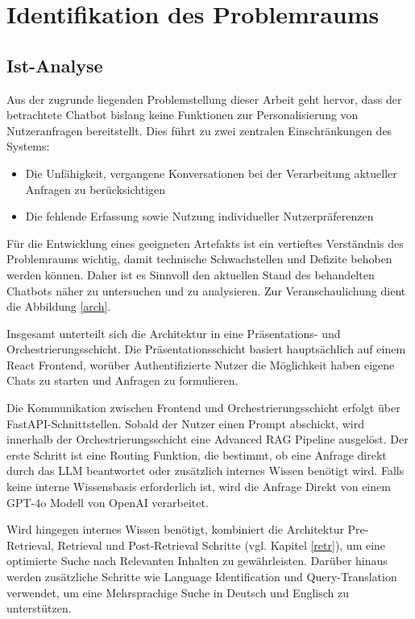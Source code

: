 



\label{Kapitel3}
\section{Identifikation des Problemraums}
\subsection{Ist-Analyse}
Aus der zugrunde liegenden Problemstellung dieser Arbeit geht hervor, dass der betrachtete Chatbot bislang keine Funktionen zur Personalisierung von Nutzeranfragen bereitstellt. Dies führt zu zwei zentralen Einschränkungen des Systems:

\begin{itemize}
	\item Die Unfähigkeit, vergangene Konversationen bei der Verarbeitung aktueller Anfragen zu berücksichtigen
	\item Die fehlende Erfassung sowie Nutzung individueller Nutzerpräferenzen
\end{itemize}

Für die Entwicklung eines geeigneten Artefakts ist ein vertieftes Verständnis des Problemraums wichtig, damit technische Schwachstellen und Defizite behoben werden können. Daher ist es Sinnvoll den aktuellen Stand des behandelten Chatbots näher zu untersuchen und zu analysieren. Zur Veranschaulichung dient die Abbildung \ref{arch}.

Insgesamt unterteilt sich die Architektur in eine Präsentations- und Orchestrierungsschicht. Die Präsentationsschicht basiert hauptsächlich auf einem React Frontend, worüber Authentifizierte Nutzer die Möglichkeit haben eigene Chats zu starten und Anfragen zu formulieren.

Die Kommunikation zwischen Frontend und Orchestrierungsschicht erfolgt über FastAPI-Schnittstellen. Sobald der Nutzer einen Prompt abschickt, wird innerhalb der Orchestrierungsschicht eine Advanced RAG Pipeline ausgelöst. Der erste Schritt ist eine Routing Funktion, die bestimmt, ob eine Anfrage direkt durch das LLM beantwortet oder zusätzlich internes Wissen benötigt wird. Falls keine interne Wissensbasis erforderlich ist, wird die Anfrage Direkt von einem GPT-4o Modell von OpenAI verarbeitet. 

Wird hingegen internes Wissen benötigt, kombiniert die Architektur Pre-Retrieval, Retrieval und Post-Retrieval Schritte (vgl. Kapitel \ref{retr}), um eine optimierte Suche nach Relevanten Inhalten zu gewährleisten. Darüber hinaus werden zusätzliche Schritte wie Language Identification und Query-Translation verwendet, um eine Mehrsprachige Suche in Deutsch und Englisch zu unterstützen.

